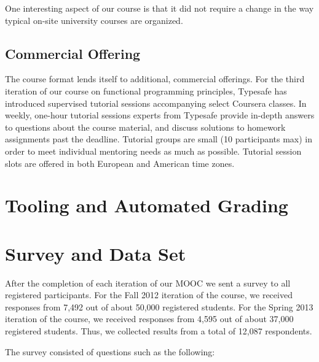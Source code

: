 \documentclass{sig-alternate}
\begin{document}
One interesting aspect of our course is that it did not require a change in
the way typical on-site university courses are organized.

\subsection{Commercial Offering}

The course format lends itself to additional, commercial offerings. For the
third iteration of our course on functional programming principles, Typesafe
has introduced supervised tutorial sessions accompanying select Coursera
classes. In weekly, one-hour tutorial sessions experts from Typesafe provide
in-depth answers to questions about the course material, and discuss solutions
to homework assignments past the deadline. Tutorial groups are small (10
participants max) in order to meet individual mentoring needs as much as
possible. Tutorial session slots are offered in both European and American
time zones.


\section{Tooling and Automated Grading}

\section{Survey and Data Set}

After the completion of each iteration of our MOOC we sent a survey to all
registered participants. For the Fall 2012 iteration of the course, we
received responses from 7,492 out of about 50,000 registered students. For the
Spring 2013 iteration of the course, we received responses from 4,595 out of
about 37,000 registered students. Thus, we collected results from a total of
12,087 respondents.

The survey consisted of questions such as the following:
\end{document}
